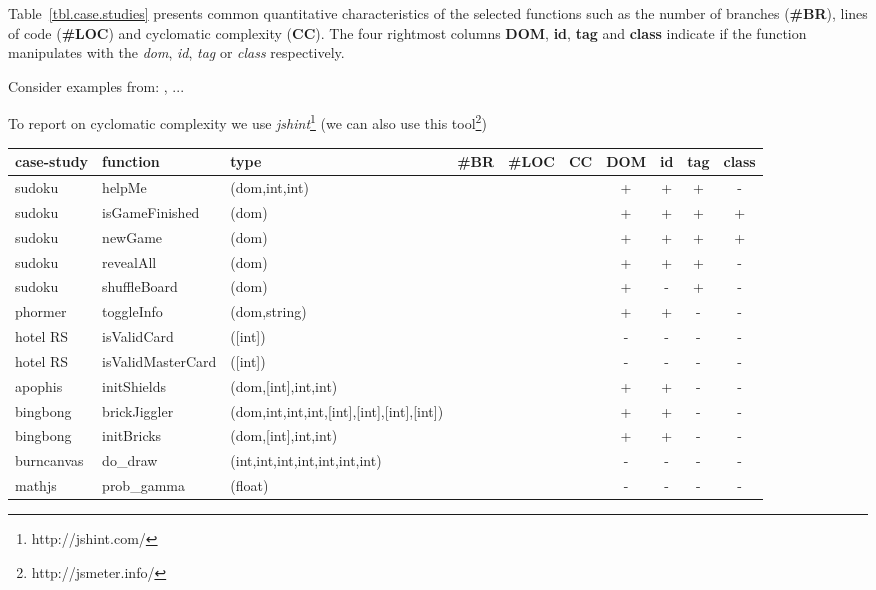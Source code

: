 \documentclass[sigconf]{acmart}
\begin{document}
Table~\ref{tbl.case.studies} presents common quantitative characteristics of the selected functions such as the number of branches (\textbf{\#BR}), lines of code (\textbf{\#LOC}) and cyclomatic complexity (\textbf{CC}). The four rightmost columns \textbf{DOM}, \textbf{id}, \textbf{tag} and \textbf{class} indicate if the function manipulates with the \emph{dom}, \emph{id}, \emph{tag} or \emph{class} respectively.       


Consider examples from: \cite{artemis2011}, \cite{dom2011}...

To report on cyclomatic complexity we use \emph{jshint}\footnote{http://jshint.com/} (we can also use this tool\footnote{http://jsmeter.info/})

\begin{table*}
  \caption{Summary of the case studies}
  \label{tbl.case.studies}
    \footnotesize
  \begin{tabular}{l|l|l|r|r|r|c|c|c|c}
    \toprule
    \textbf{case-study} & \textbf{function} & \textbf{type} & \textbf{\#BR} & \textbf{\#LOC} & \textbf{CC} & \textbf{DOM} & \textbf{id} & \textbf{tag} & \textbf{class} \\
    \midrule
    sudoku     & helpMe & (dom,int,int) & & & & + & + & + & - \\
    sudoku     & isGameFinished & (dom) & & & & + & + & + & + \\
    sudoku     & newGame & (dom)        & & & & + & + & + & + \\
    sudoku     & revealAll & (dom)      & & & & + & + & + & - \\
    sudoku     & shuffleBoard & (dom)   & & & & + & - & + & - \\
    \midrule
    phormer    & toggleInfo & (dom,string) & & & & + & + & - & - \\
    \midrule
    hotel RS   & isValidCard & ([int]) & & & & - & - & - & - \\
    hotel RS   & isValidMasterCard & ([int])  & & & & - & - & - & - \\
    \midrule
    apophis    & initShields & (dom,[int],int,int) & & & & + & + & - & -\\
    \midrule
    bingbong   & brickJiggler & (dom,int,int,int,[int],[int],[int],[int]) & & & & + & + & - & - \\
    bingbong   & initBricks & (dom,[int],int,int) & & & & + & + & - & - \\
    \midrule
    burncanvas & do\_draw & (int,int,int,int,int,int,int) & & & & - & - & - & - \\
    \midrule
    mathjs     & prob\_gamma & (float) & & & & - & - & - & - \\
    \bottomrule
  \end{tabular}
\end{table*}
\end{document}
